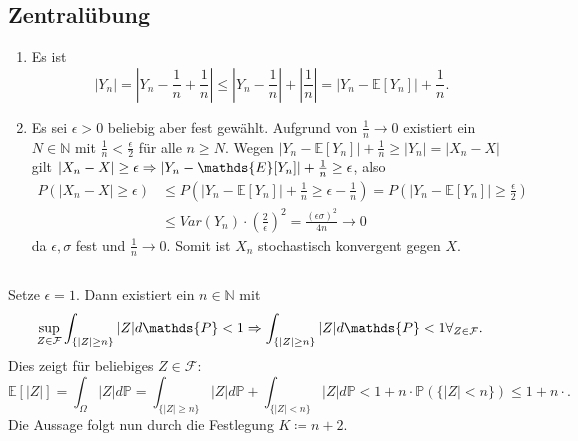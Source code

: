 \documentclass[a4paper]{article}
\begin{document}
\makeexheader

\subsection{Zentralübung}

\begin{enumerate}[label=(\alph*)]
    \item Es ist 
    \begin{equation*}
        |Y_n| = \left|Y_n - \frac{1}{n} + \frac{1}{n}\right| \leq \left| Y_n - \frac{1}{n} \right| + \left| \frac{1}{n} \right| = |Y_n - \mathds{E}[Y_n]| + \frac{1}{n}\text{.}
    \end{equation*}
    \item Es sei $\epsilon > 0$ beliebig aber fest gewählt.
    Aufgrund von $\frac{1}{n} \to 0$ existiert ein $N \in \mathds{N}$ mit $\frac{1}{n} < \frac{\epsilon}{2}$ für alle $n \geq N$.
    Wegen $|Y_n - \mathds{E}[Y_n]| + \frac{1}{n} \geq |Y_n| = |X_n - X|$ gilt $|X_n - X| \geq \epsilon \then |Y_n - \mathds{E}[Y_n]| + \frac{1}{n} \geq \epsilon$, also 
    \begin{align*}
        P(|X_n - X| \geq \epsilon) &\leq P(|Y_n - \mathds{E}[Y_n]| + \frac{1}{n} \geq \epsilon - \frac{1}{n}) = P(|Y_n - \mathds{E}[Y_n]| \geq \frac{\epsilon}{2}) \\
        &\leq Var(Y_n) \cdot \left(\frac{2}{\epsilon}\right)^2 = \frac{(\epsilon \sigma)^2}{4n} \to 0
    \end{align*}
    da $\epsilon, \sigma$ fest und $\frac{1}{n} \to 0$.
    Somit ist $X_n$ stochastisch konvergent gegen $X$.
\end{enumerate}

\subsection{}

\subsection{}

Setze $\epsilon = 1$. Dann existiert ein $n \in \mathds{N}$ mit
\begin{equation*}
    \sup_{Z \in \mathcal{F}} \int_{\{|Z| \geq n\}} |Z| d\mathds{P} < 1  \then 
    \int_{\{|Z| \geq n\}} |Z| d\mathds{P} < 1 \forall_{Z \in \mathcal{F}}\text{.}
\end{equation*}
Dies zeigt für beliebiges $Z \in \mathcal{F}$:
\begin{equation*}
    \mathds{E}[|Z|] = \int_\Omega |Z| d\mathds{P} = \int_{\{|Z| \geq n\}} |Z| d\mathds{P} + \int_{\{|Z| < n\}} |Z| d\mathds{P} < 1 + n \cdot \mathds{P}(\{|Z| < n\}) \leq 1 + n \cdot  \text{.}
\end{equation*}
Die Aussage folgt nun durch die Festlegung $K \coloneq n+2$.
\end{document}
